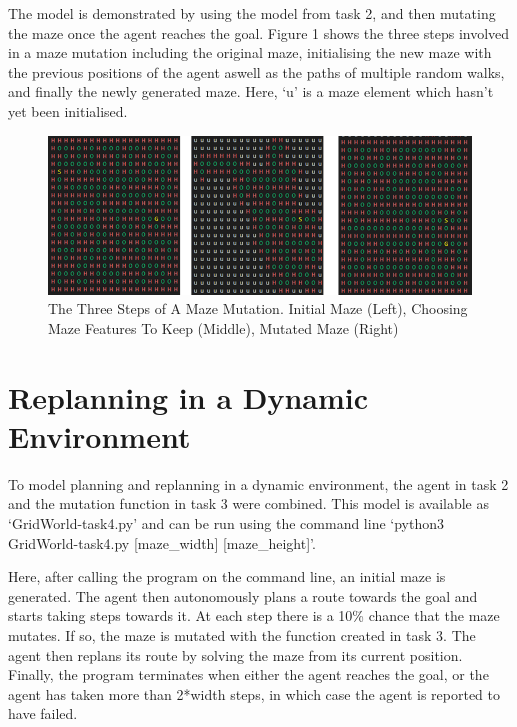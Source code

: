 \documentclass{article}
\begin{document}
	The model is demonstrated by using the model from task 2, and then mutating the maze once the agent reaches the goal. Figure 1 shows the three steps involved in a maze mutation including the original maze, initialising the new maze with the previous positions of the agent aswell as the paths of multiple random walks, and finally the newly generated maze. Here, ‘u’ is a maze element which hasn’t yet been initialised. 

\begin{figure}[ht]
	\centering
	\includegraphics[width=\textwidth]{assets/mutateMaze.png}
	\caption{The Three Steps of A Maze Mutation. Initial Maze (Left), Choosing Maze Features To Keep (Middle), Mutated Maze (Right)}
\end{figure}


\section{Replanning in a Dynamic Environment}\label{sec:test-design}

	To model planning and replanning in a dynamic environment, the agent in task 2 and the mutation function in task 3 were combined. This model is available as ‘GridWorld-task4.py’ and can be run using the command line ‘python3 GridWorld-task4.py [maze\_width] [maze\_height]’.

Here, after calling the program on the command line, an initial maze is generated. The agent then autonomously plans a route towards the goal and starts taking steps towards it. At each step there is a 10\% chance that the maze mutates. If so, the maze is mutated with the function created in task 3. The agent then replans its route by solving the maze from its current position. Finally, the program terminates when either the agent reaches the goal, or the agent has taken more than 2*width steps, in which case the agent is reported to have failed. \\
\end{document}
